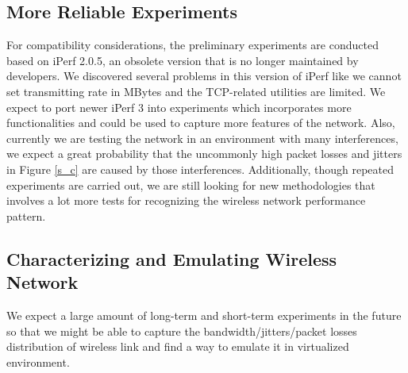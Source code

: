 \documentclass[journal,comsoc]{IEEEtran}
\begin{document}
\subsection{More Reliable Experiments}
For compatibility considerations, the preliminary experiments are conducted based on iPerf 2.0.5, an obsolete version that is no longer maintained by developers. We discovered several problems in this version of iPerf like we cannot set transmitting rate in MBytes and the TCP-related utilities are limited. We expect to port newer iPerf 3 into experiments which incorporates more functionalities and could be used to capture more features of  the network. Also, currently we are testing the network in an environment with many interferences, we expect a great probability that the uncommonly high packet losses and jitters in Figure \ref{s_c} are caused by those interferences. Additionally, though repeated experiments are carried out, we are still looking for new methodologies that involves a lot more tests for recognizing the wireless network performance pattern.

\subsection{Characterizing and Emulating Wireless Network}
We expect a large amount of long-term and short-term experiments in the future so that we might be able to capture the bandwidth/jitters/packet losses distribution of wireless link and find a way to emulate it in virtualized environment.
\ifCLASSOPTIONcaptionsoff
  \newpage
\fi





%
%
%


\end{document}
